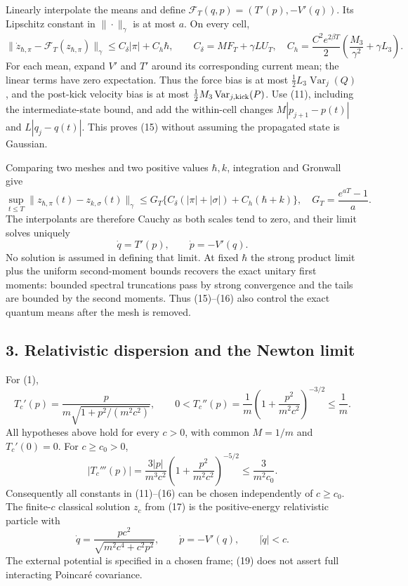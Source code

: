\documentclass[11pt,a4paper]{article}
\begin{document}
Linearly interpolate the means and define
\(\mathcal F_T(q,p)=(T'(p),-V'(q))\). Its Lipschitz constant in
\(\|\cdot\|_\gamma\) is at most \(a\). On every cell, \[
 \|\dot z_{\hbar,\pi}-\mathcal F_T(z_{\hbar,\pi})\|_\gamma
 \le C_\delta|\pi|+C_h\hbar,\qquad
 C_\delta=MF_T+\gamma LU_T,\quad
 C_h=\frac{C^2e^{2\beta T}}2
             \left(\frac{M_3}{\gamma^2}+\gamma L_3\right).\tag{15}
\] For each mean, expand \(V'\) and \(T'\) around its corresponding
current mean; the linear terms have zero expectation. Thus the force
bias is at most \(\frac12L_3\operatorname{Var}_j(Q)\), and the post-kick
velocity bias is at most
\(\frac12M_3\operatorname{Var}_{j,\rm kick}(P)\). Use (11), including
the intermediate-state bound, and add the within-cell changes
\(M|p_{j+1}-p(t)|\) and \(L|q_j-q(t)|\). This proves (15) without
assuming the propagated state is Gaussian.

Comparing two meshes and two positive values \(\hbar,k\), integration
and Gronwall give \[
 \sup_{t\le T}\|z_{\hbar,\pi}(t)-z_{k,\sigma}(t)\|_\gamma
 \le G_T\{C_\delta(|\pi|+|\sigma|)
           +C_h(\hbar+k)\},\quad
 G_T=\frac{e^{aT}-1}{a}.\tag{16}
\] The interpolants are therefore Cauchy as both scales tend to zero,
and their limit solves uniquely
\[\dot q=T'(p),\qquad \dot p=-V'(q).\tag{17}\] No solution is assumed in
defining that limit. At fixed \(\hbar\) the strong product limit plus
the uniform second-moment bounds recovers the exact unitary first
moments: bounded spectral truncations pass by strong convergence and the
tails are bounded by the second moments. Thus (15)--(16) also control
the exact quantum means after the mesh is removed.

\hypertarget{relativistic-dispersion-and-the-newton-limit}{%
\subsection{3. Relativistic dispersion and the Newton
limit}\label{relativistic-dispersion-and-the-newton-limit}}

For (1), \[
 T_c'(p)=\frac{p}{m\sqrt{1+p^2/(m^2c^2)}},\qquad
 0<T_c''(p)=\frac1m
              \left(1+\frac{p^2}{m^2c^2}\right)^{-3/2}
             \le\frac1m.\tag{18}
\] All hypotheses above hold for every \(c>0\), with common \(M=1/m\)
and \(T_c'(0)=0\). For \(c\ge c_0>0\), \[
 |T_c'''(p)|=\frac{3|p|}{m^3c^2}
       \left(1+\frac{p^2}{m^2c^2}\right)^{-5/2}
 \le\frac3{m^2c_0}.\tag{18a}
\] Consequently all constants in (11)--(16) can be chosen independently
of \(c\ge c_0\). The finite-\(c\) classical solution \(z_c\) from (17)
is the positive-energy relativistic particle with
\[\dot q=\frac{pc^2}{\sqrt{m^2c^4+c^2p^2}},\qquad
 \dot p=-V'(q),\qquad |\dot q|<c.\tag{19}\] The external potential is
specified in a chosen frame; (19) does not assert full interacting
Poincaré covariance.
\end{document}
